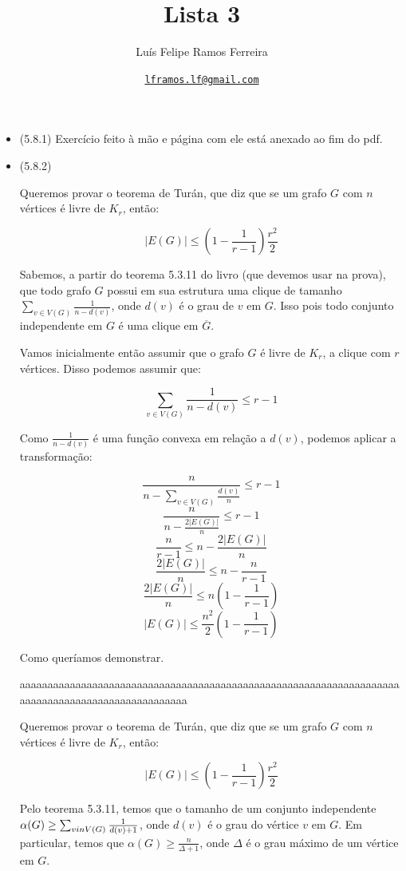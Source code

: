 \documentclass{article}
\title{Lista 3}
\author{Luís Felipe Ramos Ferreira}
\date{\href{mailto:lframos.lf@gmail.com}{\texttt{lframos.lf@gmail.com}}
}
\begin{document}
\maketitle

\begin{itemize}
	\item (5.8.1) Exercício feito à mão e página com ele está anexado ao fim do pdf.

	\item (5.8.2)

	      Queremos provar o teorema de Turán, que diz que se um grafo \(G\) com \(n\) vértices é livre de \(K_r\), então:

	      \[|E(G)| \leq (1 - \frac{1}{r-1})\frac{r^2}{2}\]

	      Sabemos, a partir do teorema 5.3.11 do livro (que devemos usar na prova), que todo grafo \(G\) possui em sua estrutura uma clique de tamanho \(\sum_{v \in V(G)} \frac{1}{n - d(v)}\),
	      onde \(d(v)\) é o grau de \(v\) em \(G\). Isso pois todo conjunto independente em \(G\) é uma clique em \(\overline{G}\).

	      Vamos inicialmente então assumir que o grafo \(G\) é livre de \(K_r\), a clique com \(r\) vértices. Disso podemos assumir que:

	      \[\sum_{v \in V(G)} \frac{1}{n - d(v)} \leq r -1\]

	      Como \(\frac{1}{n - d(v)}\) é uma função convexa em relação a \(d(v)\), podemos aplicar a transformação:

	      \[\frac{n}{n - \sum_{v \in V(G)} \frac{d(v)}{n}} \leq r - 1\]
	      \[\frac{n}{n - \frac{2 |E(G)|}{n}} \leq r - 1\]
	      \[\frac{n}{r - 1} \leq n - \frac{2 |E(G)|}{n}\]
	      \[\frac{2 |E(G)|}{n} \leq n - \frac{n}{r - 1}\]
	      \[\frac{2 |E(G)|}{n} \leq n (1 - \frac{1}{r - 1})\]
	      \[|E(G)| \leq \frac{n^2}{2} (1 - \frac{1}{r - 1})\]

	      Como queríamos demonstrar.

	      aaaaaaaaaaaaaaaaaaaaaaaaaaaaaaaaaaaaaaaaaaaaaaaaaaaaaaaaaaaaaaaaaaaaaaaaaaaaaaaaaaaaaaaaaaaaaaaaaa


	      Queremos provar o teorema de Turán, que diz que se um grafo \(G\) com \(n\) vértices é livre de \(K_r\), então:

	      \[|E(G)| \leq (1 - \frac{1}{r-1})\frac{r^2}{2}\]

	      Pelo teorema 5.3.11, temos que o tamanho de um conjunto independente \(\alpha(G) \geq \sum_{v \\in V(G)}\frac{1}{d(v)+1}\), onde \(d(v)\) é o grau do vértice \(v\) em \(G\). Em particular,
	      temos que \(\alpha(G) \geq \frac{n}{\Delta + 1}\), onde \(\Delta\) é o grau máximo de um vértice em \(G\).


\end{itemize}
\end{document}
